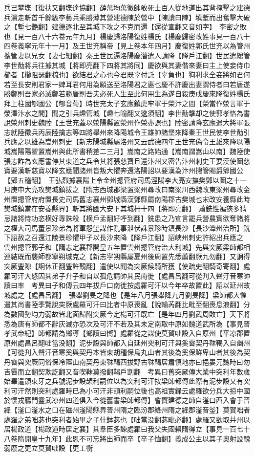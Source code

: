 兵已攀堞【復扶又翻堞達協翻】薛萬均萬徹帥敢死士百人從地道出其背掩擊之建德兵潰走斬首千餘級李藝兵乘勝薄其營建德陳於營中【陳讀曰陣】填塹而出奮擊大破之【塹七艶翻】建德逐北至其城下攻之不克而還【還從宣翻又音如字】　李密之敗也【見一百八十六卷元年九月】楊慶歸洛陽復姓楊氏【楊慶歸密改姓事見一百八十四卷義寧元年十一月】及王世充稱帝【見上卷本年四月】慶復姓郭氏世充以為管州摠管妻以兄女【妻七細翻】秦王世民逼洛陽慶濳遣人請降【降戶江翻】世民遣總管李世勣將兵往據其城【將即亮翻下四將其將同】慶欲與其妻偕來妻曰主上使妾侍巾櫛者【櫛阻瑟翻梳也】欲結君之心也今君既辜付託【辜負也】狥利求全妾將如君何若至長安則君家一婢耳君何用為願送至洛陽君之惠也慶不許慶出妻謂侍者曰若唐遂勝鄭則吾家必滅鄭若勝唐則吾夫必死人生至此何用生為遂自殺庚戌慶來降復姓楊氏拜上柱國郇國公【郇音荀】時世充太子玄應鎮虎牢軍于榮汴之間【榮當作滎言軍于滎澤汴水之間】聞之引兵趣管城【趣七喻翻又逡須翻】李世勣擊却之使郭孝恪為書說榮州刺史魏陸【王世充蓋以滎陽縣置滎州作榮亦誤也】陸密請降玄應遣大將軍張志就陸徵兵丙辰陸擒志等四將舉州來降陽城令王雄帥諸堡來降秦王世民使李世勣引兵應之以雄為嵩州刺史【新志陽城縣屬洛州又云武德四年王世充偽令王雄來降以陽城嵩陽陽翟置嵩州與此所書稍差二三月】嵩南之路始通【嵩南謂嵩山以南】魏陸使張志詐為玄應書停其東道之兵令其將張慈寶且還汴州又密告汴州刺史王要漢使圖慈寶要漢斬慈寶以降玄應聞諸州皆叛大懼奔還洛陽詔以要漢為汴州摠管賜爵郳國公【郳五稽翻】　王弘烈據襄陽上令金州摠管府司馬涇陽李大亮安撫樊鄧以圖之十一月庚申大亮攻樊城鎮拔之【隋志西城郡梁置梁州尋改曰南梁川西魏改東梁州尋改金州置摠管府府置長史司馬舊志襄州鄧城縣漢鄧縣屬南陽郡古樊城也宋改安養縣此時樊城鎮當在安養縣界】斬其將國大安下其城柵十四【將即亮翻】　蕭銑性褊狹多猜忌諸將恃功恣横好專誅殺【横戶孟翻好呼到翻】銑患之乃宣言罷兵營農實欲奪諸將之權大司馬董景珍弟為將軍怨望謀作亂事泄伏誅景珍時鎮長沙【長沙潭州治所】銑下詔赦之召還江陵景珍懼甲子以長沙來降【降戶江翻】詔峽州刺史許紹出兵應之　雲州摠管郭子和【隋志定襄郡開皇五年置雲州摠管府治大利城】先與突厥梁師都相連結既而襲師都寧朔城克之【新志寜朔縣屬夏州後周置先悉薦翻厥九勿翻】又詗得突厥舋隙【詗休正翻舋許覲翻】遣使以聞為突厥候騎所獲【使疏吏翻騎奇寄翻】處羅可汗大怒囚其弟子升子和自以孤危請帥其民南徙【處昌呂翻可從刋入聲汙音寒帥讀曰率　考異曰子和傳云四年拔戶口南徙按處羅可汗以今年卒故置此】詔以延州故城處之【處昌呂翻】　張舉劉旻之降也【是年八月張舉降九月劉旻降】梁師都大懼遣其尚書陸季覽說突厥處羅可汗曰比者中原喪亂【說輸芮翻比毗至翻喪息浪翻】分為數國勢均力弱故皆北面歸附突厥今定楊可汗既亡【是年四月劉武周敗亡】天下將悉為唐有師都不辭灰滅亦恐次及可汗不若及其未定南取中原如魏道武所為【事見晉孝武帝紀】師都請為鄉導【鄉讀曰嚮】處羅從之謀使莫賀咄設入自原州【平凉郡置原州處昌呂翻咄當没翻】泥步設與師都入自延州突利可汗與奚霫契丹靺鞨入自幽州【可從刋入聲汗音寒奚與契丹本皆東胡種保烏丸山者其後為奚保鮮卑山者其後為契丹霫與突厥同俗保冷陘山南契丹東靺鞨西拔野古靺鞨居肅慎地亦曰挹婁元魏時曰勿吉霫而立翻契欺訖翻又音喫靺莫撥翻鞨戶割翻　考異曰舊突厥傳大業中突利年數歲始畢遣領東牙之兵號泥步設頡利嗣位以為突利可汗按梁師都傳此際有泥步設又有突利可汗然則突利處羅時已為小可汗非頡利嗣位後也高祖實録云處羅欲分兵大掠中國於懷戎鴈門靈武凉州四道俱入今從舊書梁師都傳】會竇建德之師自滏口西入會于晉絳【滏口滏水之口在磁州滏陽縣界晉州隋之臨汾郡絳州隋之絳郡滏音釡】莫賀咄者處羅之弟咄苾也突利者始畢之子什鉢苾也【咄當没翻苾毗必翻】處羅又欲取并州以居楊政道【楊政道時居定襄】其羣臣多諫處羅曰我父失國賴隋得立【事見一百七十八卷隋開皇十九年】此恩不可忘將出師而卒【卒子恤翻】義成公主以其子奥射設醜弱廢之更立莫賀咄設【更工衡
